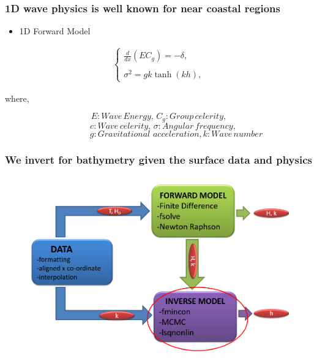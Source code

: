 \documentclass[7pt]{beamer}
\begin{document}
\begin{frame}
	\frametitle{1D wave physics is well known for near coastal regions}
		\centering
		\begin{itemize}
			\item 1D Forward Model
		\end{itemize}
		\begin{eqnarray*}
			\label{fp1}
			\left \{
				\begin{array}{lll}
					\frac{d}{dx}\left(EC_g\right)=-\delta,\\
					\\
					\sigma^2=gk\tanh(kh),
					\label{ode}
				\end{array}
			\right.
		\end{eqnarray*}
		\begin{flushleft}
			where,
		\end{flushleft}
		$${E: Wave \,Energy,\, C_{g}: Group \,celerity,}$$
		$${\quad c: Wave \,celerity,\, \sigma: Angular \,frequency,}$$
		$${\quad\quad\quad\quad g: Gravitational\,\, acceleration,k: Wave \,number}$$
\end{frame}

\begin{frame}
 \frametitle{We invert for bathymetry given the surface data and physics}

\begin{figure}[flowchart]
\includegraphics[width=1.0\linewidth]{img/INV.png}\hfill
\end{figure}


\end{frame}
\end{document}
